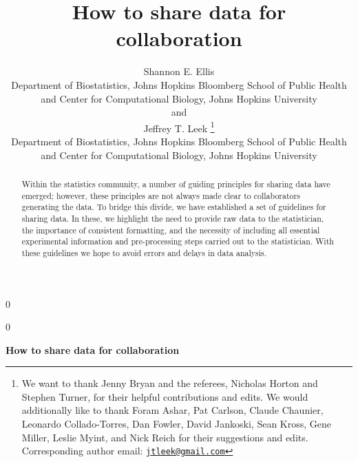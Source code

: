 \documentclass[12pt]{article}
\newcommand{\blind}{0}
\begin{document}
\def\spacingset#1{\renewcommand{\baselinestretch}%
{#1}\small\normalsize} \spacingset{1}



\blind
{
  \title{\bf How to share data for collaboration}

  \author{
        Shannon E. Ellis \\
    Department of Biostatistics, Johns Hopkins Bloomberg School of Public
    Health and Center for Computational Biology, Johns Hopkins University\\
     and \\     Jeffrey T. Leek \thanks{We want to thank Jenny Bryan and the referees, Nicholas Horton and
Stephen Turner, for their helpful contributions and edits. We would
additionally like to thank Foram Ashar, Pat Carlson, Claude Chaunier,
Leonardo Collado-Torres, Dan Fowler, David Jankoski, Sean Kross, Gene
Miller, Leslie Myint, and Nick Reich for their suggestions and edits.
Corresponding author email:
\href{mailto:jtleek@gmail.com}{\nolinkurl{jtleek@gmail.com}}} \\
    Department of Biostatistics, Johns Hopkins Bloomberg School of Public
    Health and Center for Computational Biology, Johns Hopkins University\\
      }
  \maketitle
} \fi

\blind
{
  \bigskip
  \bigskip
  \bigskip
  \begin{center}
    {\LARGE\bf How to share data for collaboration}
  \end{center}
  \medskip
} \fi

\bigskip
\begin{abstract}
Within the statistics community, a number of guiding principles for
sharing data have emerged; however, these principles are not always made
clear to collaborators generating the data. To bridge this divide, we
have established a set of guidelines for sharing data. In these, we
highlight the need to provide raw data to the statistician, the
importance of consistent formatting, and the necessity of including all
essential experimental information and pre-processing steps carried out
to the statistician. With these guidelines we hope to avoid errors and
delays in data analysis.
\end{abstract}
\end{document}
